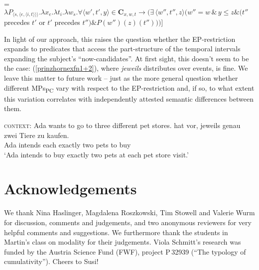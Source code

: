 \documentclass[output=paper]{langscibook}
\begin{document}
\ea {} = $\lambda P_{\langle s, \langle e, \langle i,t \rangle \rangle \rangle}. \lambda x_{e}. \lambda t_{i}. \lambda w_{s}. \forall \langle w',t',y \rangle \in \textbf{C}_{x,w,t} \rightarrow (\exists\, \langle w'', t'', z \rangle (w'' = w \, \& \, y \le z \& (t''$ precedes $t'$ or $t'$ precedes $t'') \& P(w'')(z)(t'')))]$
 \label{prinzhornhazel}\z  
 
In light of our approach, this raises the question whether the EP-restriction expands to predicates that access the part-structure of the temporal intervals expanding the subject's “now-candidates”. At first sight, this doesn't seem to be the case:   (\ref{prinzhornexfn1+2}), where \textit{jeweils} distributes over events, is fine. We leave this matter to future work -- just as the more general question  whether different MPs\textsubscript{PC} vary with respect to the EP-restriction and, if so, to what extent this variation correlates with independently attested semantic differences between them.
 
\ea \label{prinzhornexfn1+2}
\ea \label{prinzhornexfn1} \textsc{context:} Ada wants to go to three different pet stores.
\ex {} {hat vor}, {jeweils} {genau} {zwei} {Tiere} {zu} {kaufen}.\\
   Ada intends each exactly two pets to buy \\
\glt `Ada intends to buy exactly two pets at each pet store visit.' \label{prinzhornexfn2}
\z \z

\section*{Acknowledgements}
\begin{sloppypar}
We thank Nina Haslinger, Magdalena Roszkowski, Tim Stowell and Valerie Wurm for discussion, comments and judgements, and two anonymous reviewers for very helpful comments and suggestions. We furthermore thank the students in Martin's class on modality for their judgements. Viola Schmitt's research was funded by the Austria Science Fund (FWF), project  P\,32939 (“The typology of cumulativity”). Cheers to Susi!
\end{sloppypar}

\printbibliography[heading=subbibliography,notkeyword=this]
\end{document}
